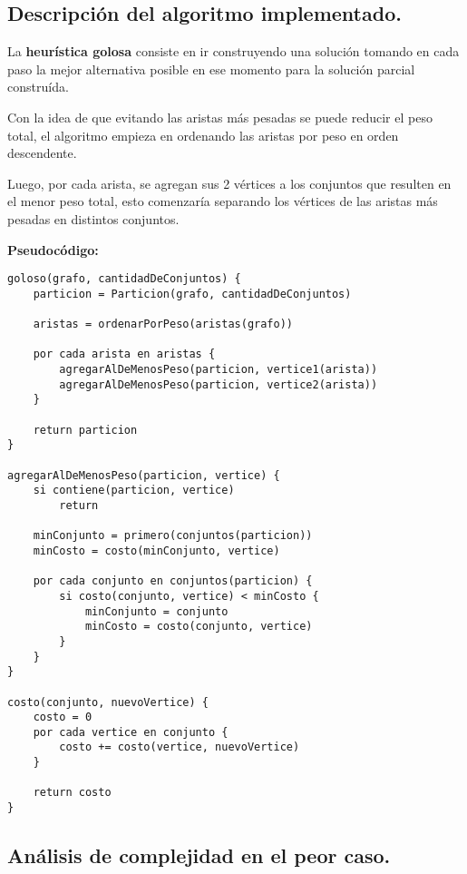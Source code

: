 \subsection{Descripción del algoritmo implementado.}
\vspace*{0.3cm}

La \textbf{heurística golosa} consiste en ir construyendo una solución
tomando en cada paso la mejor alternativa posible en ese momento para la
solución parcial construída.


Con la idea de que evitando las aristas más pesadas se puede reducir el peso
total, el algoritmo empieza en ordenando las aristas por peso en orden
descendente.

Luego, por cada arista, se agregan sus 2 vértices a los conjuntos que
resulten en el menor peso total, esto comenzaría separando los vértices
de las aristas más pesadas en distintos conjuntos.

\vspace*{0.5cm}

\textbf{Pseudocódigo:}

\vspace*{0.3cm}

\begin{verbatim}
goloso(grafo, cantidadDeConjuntos) {
    particion = Particion(grafo, cantidadDeConjuntos)

    aristas = ordenarPorPeso(aristas(grafo))

    por cada arista en aristas {
        agregarAlDeMenosPeso(particion, vertice1(arista))
        agregarAlDeMenosPeso(particion, vertice2(arista))
    }

    return particion
}

agregarAlDeMenosPeso(particion, vertice) {
    si contiene(particion, vertice)
        return

    minConjunto = primero(conjuntos(particion))
    minCosto = costo(minConjunto, vertice)

    por cada conjunto en conjuntos(particion) {
        si costo(conjunto, vertice) < minCosto {
            minConjunto = conjunto
            minCosto = costo(conjunto, vertice)
        }
    }
}

costo(conjunto, nuevoVertice) {
    costo = 0
    por cada vertice en conjunto {
        costo += costo(vertice, nuevoVertice)
    }

    return costo
}
\end{verbatim}


\newpage
\subsection{Análisis de complejidad en el peor caso.}
\vspace*{0.3cm}

